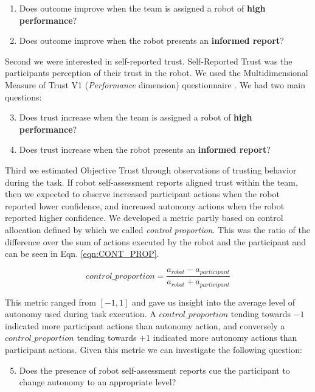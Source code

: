 \documentclass[aaai]{article}
\begin{document}
\begin{enumerate}
    \item Does outcome improve when the team is assigned a robot of \textbf{high performance}?
    \item Does outcome improve when the robot presents an \textbf{informed report}?
\end{enumerate}

Second we were interested in self-reported trust. Self-Reported Trust was the participants perception of their trust in the robot. We used the Multidimensional Measure of Trust V1 (\textit{Performance} dimension) questionnaire \cite{mdmt_ullman}. We had two main questions:


\begin{enumerate}
\setcounter{enumi}{2}
    \item Does trust increase when the team is assigned a robot of \textbf{high performance}?
    \item Does trust increase when the robot presents an \textbf{informed report}?
\end{enumerate}

Third we estimated Objective Trust through observations of trusting behavior during the task. If robot self-assessment reports aligned trust within the team, then we expected to observe increased participant actions when the robot reported lower confidence, and increased autonomy actions when the robot reported higher confidence. We developed a metric partly based on control allocation defined by \cite{team_performance} which we called \textit{control proportion}. This was the ratio of the difference over the sum of actions executed by the robot and the participant and can be seen in Eqn. \ref{eqn:CONT_PROP}.

\begin{equation}
    control\_proportion = \frac{a_{robot} - a_{participant}}{a_{robot}+a_{participant}}
    \label{eqn:CONT_PROP}
\end{equation}

This metric ranged from $[-1,1]$ and gave us insight into the average level of autonomy used during task execution. A $control\_proportion$ tending towards $-1$ indicated more participant actions than autonomy action, and conversely a $control\_proportion$ tending towards $+1$ indicated more autonomy actions than participant actions. Given this metric we can investigate the following question:

\begin{enumerate}
    \setcounter{enumi}{4}
    \item Does the presence of robot self-assessment reports cue the participant to change autonomy to an appropriate level?
\end{enumerate}
\end{document}
